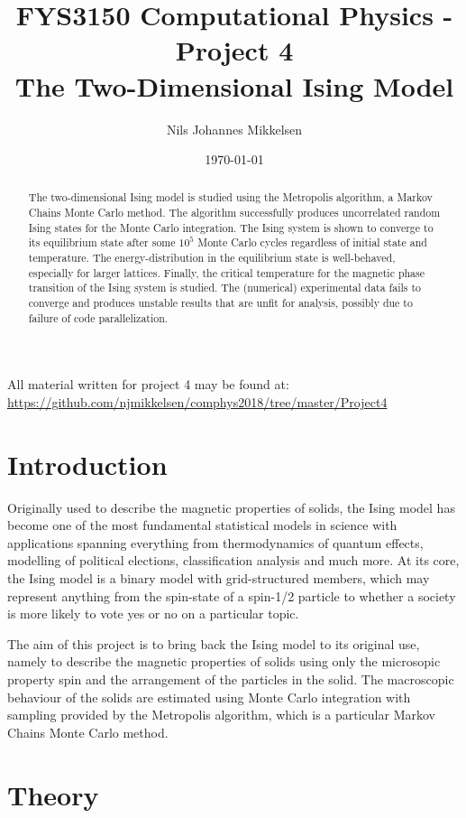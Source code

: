\documentclass[nofootinbib,reprint,english]{revtex4-1}
\begin{document}
\title{FYS3150 Computational Physics - Project 4\\The Two-Dimensional Ising Model}
\author{Nils Johannes Mikkelsen}
\date{\today}
\noaffiliation
\begin{abstract}
The two-dimensional Ising model is studied using the Metropolis algorithm, a Markov Chains Monte Carlo method. The algorithm successfully produces uncorrelated random Ising states for the Monte Carlo integration. The Ising system is shown to converge to its equilibrium state after some \(10^5\) Monte Carlo cycles regardless of initial state and temperature. The energy-distribution in the equilibrium state is well-behaved, especially for larger lattices. Finally, the critical temperature for the magnetic phase transition of the Ising system is studied. The (numerical) experimental data fails to converge and produces unstable results that are unfit for analysis, possibly due to failure of code parallelization.
\end{abstract}
\maketitle
All material written for project 4 may be found at:\\
{\scriptsize\url{https://github.com/njmikkelsen/comphys2018/tree/master/Project4}}
\section{Introduction}
Originally used to describe the magnetic properties of solids, the Ising model has become one of the most fundamental statistical models in science with applications spanning everything from thermodynamics of quantum effects, modelling of political elections, classification analysis and much more. At its core, the Ising model is a binary model with grid-structured members, which may represent anything from the spin-state of a spin-1/2 particle to whether a society is more likely to vote yes or no on a particular topic.

The aim of this project is to bring back the Ising model to its original use, namely to describe the magnetic properties of solids using only the microsopic property spin and the arrangement of the particles in the solid. The macroscopic behaviour of the solids are estimated using Monte Carlo integration with sampling provided by the Metropolis algorithm, which is a particular Markov Chains Monte Carlo method.
\section{Theory}
\end{document}
